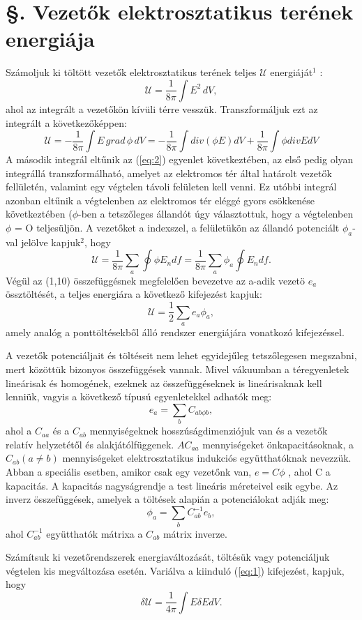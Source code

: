 \documentclass{article}
\begin{document}
\section{§. Vezetők elektrosztatikus terének energiája}
Számoljuk ki töltött vezetők elektrosztatikus terének teljes $\mathcal{U}$ energiáját$^1$ :
\begin{equation} \label{eq:1}
\mathcal{U} = \frac{1}{8\pi} \int E^2 \, dV,
\end{equation}
ahol az integrált a vezetőkön kívüli térre vesszük. Transzformáljuk ezt az integrált a következőképpen:
\begin{equation} \label{eq:2}
\mathcal{U} = -\frac{1}{8\pi} \int E \, grad \, \phi \, dV = -\frac{1}{8\pi} \int div (\phi E) dV + \frac{1}{8\pi} \int \phi div E dV
\end{equation}
A második integrál eltűnik az (\ref{eq:2}) egyenlet következtében, az első pedig olyan integrállá transzformálható, amelyet az elektromos tér által határolt vezetők fellületén, valamint egy végtelen távoli felületen kell venni. Ez utóbbi integrál azonban eltűnik a végtelenben az elektromos tér eléggé gyors csökkenése következtében ($\phi$-ben a tetszőleges állandót úgy választottuk, hogy a végtelenben $\phi$ = O teljesüljön. A vezetőket a indexszel, a felületükön az állandó potenciált $\phi_a$-val jelölve kapjuk$^2$, hogy
\begin{equation} \label{eq:3}
\mathcal{U} = \frac{1}{8\pi} \sum\limits_{a} \oint \phi E_n df = \frac{1}{8\pi} \sum\limits_{a} \phi_a \oint E_n df.
\end{equation}
Végül az (1,10) összefüggésnek megfelelően bevezetve az a-adik vezetö $e_a$ össztöltését, a teljes energiára a következő kifejezést kapjuk:
\begin{equation} \label{eq:4}
\mathcal{U} = \frac{1}{2} \sum\limits_{a} e_a \phi_a ,
\end{equation}
amely analóg a ponttöltésekből álló rendszer energiájára vonatkozó kifejezéssel.

A vezetők potenciáljait és töltéseit nem lehet egyidejűleg tetszőlegesen megszabni, mert közöttük bizonyos összefüggések vannak. Mivel vákuumban a téregyenletek lineárisak és homogének, ezeknek az összefüggéseknek is lineárisaknak kell lenniük, vagyis a következő típusú egyenletekkel adhatók meg:
\begin{equation} \label{eq:5}
e_a = \sum\limits_{b} C_{ab\phi b} ,
\end{equation}
ahol a $C_{aa}$ és a $C_{ab}$ mennyiségeknek hosszúságdimenziójuk van és a vezetők relatív helyzetétől és alakjátólfüggenek. $AC_{aa}$ mennyiségeket önkapacitásoknak, a $C_{ab}(a \neq b)$ mennyiségeket elektrosztatikus indukciós együtthatóknak nevezzük. Abban a
speciális esetben, amikor csak egy vezetőnk van, $e = C\phi$ , ahol C a kapacitás. A kapacitás nagyságrendje a test lineáris méreteivel esik egybe. Az inverz összefüggések, amelyek a töltések alapián a potenciálokat adják meg:
\begin{equation} \label{eq:6}
\phi_a = \sum\limits_{b} C_{ab}^{-1} e_b ,
\end{equation}
ahol $C_{ab}^{-1}$ együtthatók mátrixa a $C_{ab}$ mátrix inverze.

Számítsuk ki vezetőrendszerek energiaváltozását, töltésük vagy potenciáljuk végtelen kis megváltozása esetén. Variálva a kiinduló (\ref{eq:1}) kifejezést, kapjuk, hogy
\begin{equation} \label{eq:7}
\delta \mathcal{U} = \frac{1}{4 \pi} \int E \delta EdV .
\end{equation}
\end{document}

